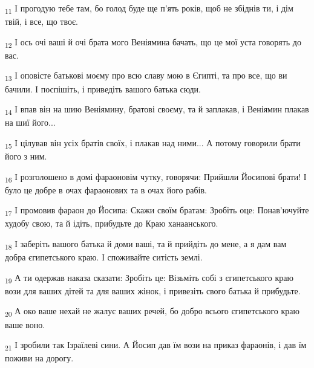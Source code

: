 \begin{tcolorbox}
\textsubscript{11} І прогодую тебе там, бо голод буде ще п'ять років, щоб не збіднів ти, і дім твій, і все, що твоє.
\end{tcolorbox}
\begin{tcolorbox}
\textsubscript{12} І ось очі ваші й очі брата мого Веніямина бачать, що це мої уста говорять до вас.
\end{tcolorbox}
\begin{tcolorbox}
\textsubscript{13} І оповісте батькові моєму про всю славу мою в Єгипті, та про все, що ви бачили. І поспішіть, і приведіть вашого батька сюди.
\end{tcolorbox}
\begin{tcolorbox}
\textsubscript{14} І впав він на шию Веніямину, братові своєму, та й заплакав, і Веніямин плакав на шиї його...
\end{tcolorbox}
\begin{tcolorbox}
\textsubscript{15} І цілував він усіх братів своїх, і плакав над ними... А потому говорили брати його з ним.
\end{tcolorbox}
\begin{tcolorbox}
\textsubscript{16} І розголошено в домі фараоновім чутку, говорячи: Прийшли Йосипові брати! І було це добре в очах фараонових та в очах його рабів.
\end{tcolorbox}
\begin{tcolorbox}
\textsubscript{17} І промовив фараон до Йосипа: Скажи своїм братам: Зробіть оце: Понав'ючуйте худобу свою, та й ідіть, прибудьте до Краю ханаанського.
\end{tcolorbox}
\begin{tcolorbox}
\textsubscript{18} І заберіть вашого батька й доми ваші, та й прийдіть до мене, а я дам вам добра єгипетського краю. І споживайте ситість землі.
\end{tcolorbox}
\begin{tcolorbox}
\textsubscript{19} А ти одержав наказа сказати: Зробіть це: Візьміть собі з єгипетського краю вози для ваших дітей та для ваших жінок, і привезіть свого батька й прибудьте.
\end{tcolorbox}
\begin{tcolorbox}
\textsubscript{20} А око ваше нехай не жалує ваших речей, бо добро всього єгипетського краю ваше воно.
\end{tcolorbox}
\begin{tcolorbox}
\textsubscript{21} І зробили так Ізраїлеві сини. А Йосип дав їм вози на приказ фараонів, і дав їм поживи на дорогу.
\end{tcolorbox}
